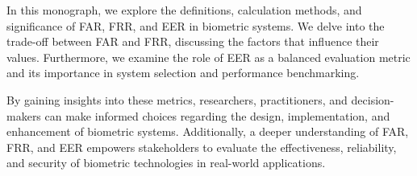 In this monograph, we explore the definitions, calculation methods, and significance of FAR, FRR, and EER in biometric systems. We delve into the trade-off between FAR and FRR, discussing the factors that influence their values. Furthermore, we examine the role of EER as a balanced evaluation metric and its importance in system selection and performance benchmarking.

By gaining insights into these metrics, researchers, practitioners, and decision-makers can make informed choices regarding the design, implementation, and enhancement of biometric systems. Additionally, a deeper understanding of FAR, FRR, and EER empowers stakeholders to evaluate the effectiveness, reliability, and security of biometric technologies in real-world applications.
